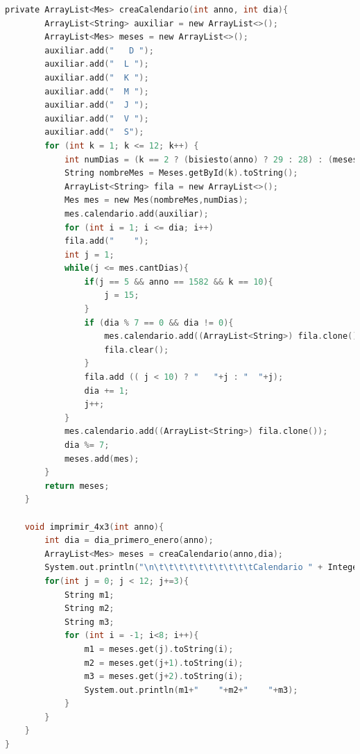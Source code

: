 \documentclass[10pt,journal,compsoc]{IEEEtran}
\begin{document}
\begin{lstlisting}[language = C, caption = {Se omiten los comentarios en el código con el fin de ahorrar espacio}]
	private ArrayList<Mes> creaCalendario(int anno, int dia){
		ArrayList<String> auxiliar = new ArrayList<>();
		ArrayList<Mes> meses = new ArrayList<>();
		auxiliar.add("   D ");
		auxiliar.add("  L ");
		auxiliar.add("  K ");
		auxiliar.add("  M ");
		auxiliar.add("  J ");
		auxiliar.add("  V ");
		auxiliar.add("  S");
		for (int k = 1; k <= 12; k++) {
			int numDias = (k == 2 ? (bisiesto(anno) ? 29 : 28) : (meses31.indexOf(k) != -1 ? 31 : 30));
			String nombreMes = Meses.getById(k).toString();
			ArrayList<String> fila = new ArrayList<>();
			Mes mes = new Mes(nombreMes,numDias);
			mes.calendario.add(auxiliar);
			for (int i = 1; i <= dia; i++)
			fila.add("    ");
			int j = 1;
			while(j <= mes.cantDias){
				if(j == 5 && anno == 1582 && k == 10){
					j = 15;
				}
				if (dia % 7 == 0 && dia != 0){
					mes.calendario.add((ArrayList<String>) fila.clone());
					fila.clear();
				}
				fila.add (( j < 10) ? "   "+j : "  "+j);
				dia += 1;
				j++;
			}
			mes.calendario.add((ArrayList<String>) fila.clone());
			dia %= 7;
			meses.add(mes);
		}
		return meses;
	}

	void imprimir_4x3(int anno){
		int dia = dia_primero_enero(anno);
		ArrayList<Mes> meses = creaCalendario(anno,dia);
		System.out.println("\n\t\t\t\t\t\t\t\t\t\tCalendario " + Integer.toString(anno) + "\n");
		for(int j = 0; j < 12; j+=3){
			String m1;
			String m2;
			String m3;
			for (int i = -1; i<8; i++){
				m1 = meses.get(j).toString(i);
				m2 = meses.get(j+1).toString(i);
				m3 = meses.get(j+2).toString(i);
				System.out.println(m1+"    "+m2+"    "+m3);
			}
		}
	}
}
\end{lstlisting}
\end{document}
